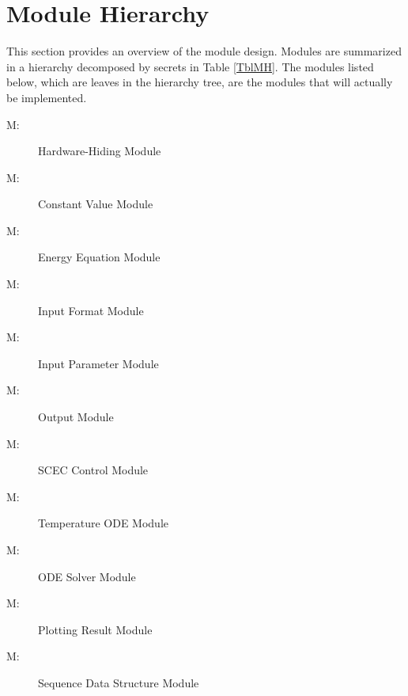 \documentclass[12pt, titlepage]{article}
\newcounter{mnum}
\newcommand{\mthemnum}{M\themnum}
\begin{document}
\section{Module Hierarchy} \label{SecMH}

This section provides an overview of the module design. Modules are summarized
in a hierarchy decomposed by secrets in Table \ref{TblMH}. The modules listed
below, which are leaves in the hierarchy tree, are the modules that will
actually be implemented.

\begin{description}
\item [ \mthemnum \label{1_mHH}:] Hardware-Hiding Module
\item [ \mthemnum \label{2_mHH}:] Constant Value Module
\item [ \mthemnum \label{3_mHH}:] Energy Equation Module
\item [ \mthemnum \label{4_mHH}:] Input Format Module
\item [ \mthemnum \label{5_mHH}:] Input Parameter Module
\item [ \mthemnum \label{6_mHH}:] Output Module
\item [ \mthemnum \label{7_mHH}:] SCEC Control Module
\item [ \mthemnum \label{8_mHH}:] Temperature ODE Module
\item [ \mthemnum \label{9_mHH}:] ODE Solver Module
\item [ \mthemnum \label{10_mHH}:] Plotting Result Module
\item [ \mthemnum \label{12_mHH}:] Sequence Data Structure Module 

\end{description}
\end{document}
